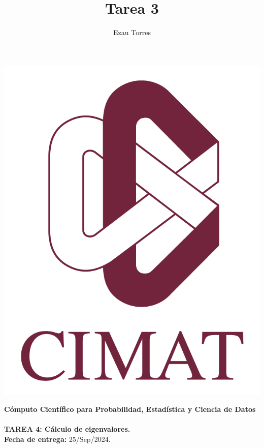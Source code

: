\documentclass[a4paper,12pt]{report}
\title{Tarea 3}
\author{Ezau Torres}
\begin{document}
	\begin{minipage}{0.15\textwidth}
		\centering
		\includegraphics[width=\textwidth]{IMAGENES/logo}
	\end{minipage}
	\begin{minipage}{0.85\textwidth}
		\centering
		\textbf{\large Cómputo Científico para Probabilidad, Estadística y Ciencia de Datos}\\
		\medskip
		 \\
		\medskip
		\textbf{\large TAREA 4: Cálculo de eigenvalores.}\\
		\medskip
		\textbf{Fecha de entrega:} 25/Sep/2024.
	\end{minipage}

\vspace{5mm}



\end{document}

